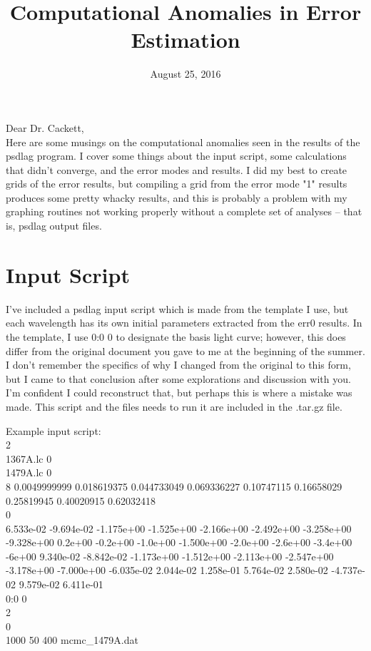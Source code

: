 \documentclass[11pt,letterpaper]{article}
\begin{document}
\title{Computational Anomalies in Error Estimation}
\date{August 25, 2016}

Dear Dr. Cackett,\\


Here are some musings on the computational anomalies seen in the results of the psdlag program. I cover some things about the input script, some calculations that didn't converge, and the error modes and results. I did my best to create grids of the error results, but compiling a grid from the error mode "1" results produces some pretty whacky results, and this is probably a problem with my graphing routines not working properly without a complete set of analyses -- that is, psdlag output files.

\section{Input Script}
I've included a psdlag input script which is made from the template I use, but each wavelength has its own initial parameters extracted from the err0 results. In the template, I use 0:0 0 to designate the basis light curve; however, this does differ from the original document you gave to me at the beginning of the summer. I don't remember the specifics of why I changed from the original to this form, but I came to that conclusion after some explorations and discussion with you. I'm confident I could reconstruct that, but perhaps this is where a mistake was made. This script and the files needs to run it are included in the .tar.gz file.

Example input script: \\
2\\
1367A.lc 0\\
1479A.lc 0\\
8 0.0049999999 0.018619375 0.044733049 0.069336227 0.10747115 0.16658029 0.25819945 0.40020915 0.62032418\\
0\\
6.533e-02 -9.694e-02 -1.175e+00 -1.525e+00 -2.166e+00 -2.492e+00 -3.258e+00 -9.328e+00 0.2e+00 -0.2e+00 -1.0e+00 -1.500e+00 -2.0e+00 -2.6e+00 -3.4e+00 -6e+00 9.340e-02 -8.842e-02 -1.173e+00 -1.512e+00 -2.113e+00 -2.547e+00 -3.178e+00 -7.000e+00 -6.035e-02 2.044e-02 1.258e-01 5.764e-02 2.580e-02 -4.737e-02 9.579e-02 6.411e-01\\
0:0 0\\
2\\
0\\
1000 50 400 mcmc\_1479A.dat\\
\end{document}
